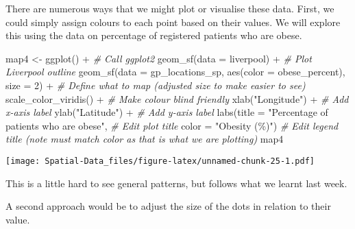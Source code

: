 \documentclass[
]{book}
\newenvironment{Shaded}{\begin{snugshade}}{\end{snugshade}}
\newcommand{\AttributeTok}[1]{\textcolor[rgb]{0.77,0.63,0.00}{#1}}
\newcommand{\CommentTok}[1]{\textcolor[rgb]{0.56,0.35,0.01}{\textit{#1}}}
\newcommand{\DecValTok}[1]{\textcolor[rgb]{0.00,0.00,0.81}{#1}}
\newcommand{\FunctionTok}[1]{\textcolor[rgb]{0.00,0.00,0.00}{#1}}
\newcommand{\NormalTok}[1]{#1}
\newcommand{\OtherTok}[1]{\textcolor[rgb]{0.56,0.35,0.01}{#1}}
\newcommand{\SpecialCharTok}[1]{\textcolor[rgb]{0.00,0.00,0.00}{#1}}
\newcommand{\StringTok}[1]{\textcolor[rgb]{0.31,0.60,0.02}{#1}}
\begin{document}
There are numerous ways that we might plot or visualise these data. First, we could simply assign colours to each point based on their values. We will explore this using the data on percentage of registered patients who are obese.

\begin{Shaded}
\begin{Highlighting}[]
\NormalTok{map4 }\OtherTok{\textless{}{-}} \FunctionTok{ggplot}\NormalTok{() }\SpecialCharTok{+} \CommentTok{\# Call ggplot2}
  \FunctionTok{geom\_sf}\NormalTok{(}\AttributeTok{data =}\NormalTok{ liverpool) }\SpecialCharTok{+} \CommentTok{\# Plot Liverpool outline}
  \FunctionTok{geom\_sf}\NormalTok{(}\AttributeTok{data =}\NormalTok{ gp\_locations\_sp, }\FunctionTok{aes}\NormalTok{(}\AttributeTok{color =}\NormalTok{ obese\_percent), }\AttributeTok{size =} \DecValTok{2}\NormalTok{) }\SpecialCharTok{+} \CommentTok{\# Define what to map (adjusted size to make easier to see)}
  \FunctionTok{scale\_color\_viridis}\NormalTok{() }\SpecialCharTok{+} \CommentTok{\# Make colour blind friendly}
  \FunctionTok{xlab}\NormalTok{(}\StringTok{"Longitude"}\NormalTok{) }\SpecialCharTok{+} \CommentTok{\# Add x{-}axis label}
  \FunctionTok{ylab}\NormalTok{(}\StringTok{"Latitude"}\NormalTok{) }\SpecialCharTok{+} \CommentTok{\# Add y{-}axis label}
  \FunctionTok{labs}\NormalTok{(}\AttributeTok{title =} \StringTok{"Percentage of patients who are obese"}\NormalTok{, }\CommentTok{\# Edit plot title }
       \AttributeTok{color =} \StringTok{"Obesity (\%)"}\NormalTok{) }\CommentTok{\# Edit legend title (note must match color as that is what we are plotting)}
\NormalTok{map4}
\end{Highlighting}
\end{Shaded}

\texttt{[image: Spatial-Data\_files/figure-latex/unnamed-chunk-25-1.pdf]}

This is a little hard to see general patterns, but follows what we learnt last week.

A second approach would be to adjust the size of the dots in relation to their value.
\end{document}
